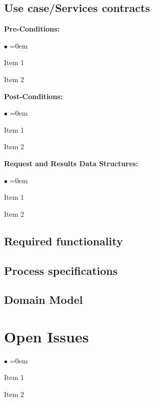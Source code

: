 \documentclass[english]{article}
\begin{document}
		\subsection{Use case/Services contracts}

			\textbf{Pre-Conditions:}
				\begin{list}{$\bullet$}{\leftmargin=1.5cm \itemindent=0em}
					\item Item 1
					\item Item 2
				\end{list}
			\textbf{Post-Conditions:}
				\begin{list}{$\bullet$}{\leftmargin=1.5cm \itemindent=0em}
					\item Item 1
					\item Item 2
				\end{list}
			\textbf{Request and Results Data Structures:}
				\begin{list}{$\bullet$}{\leftmargin=1.5cm \itemindent=0em}
					\item Item 1
					\item Item 2
				\end{list}

		\subsection{Required functionality}

		\subsection{Process specifications}

		\subsection{Domain Model}

	\section{Open Issues}
		\begin{list}{$\bullet$}{\leftmargin=1.5cm \itemindent=0em}
			\item Item 1
			\item Item 2
		\end{list}
\end{document}
